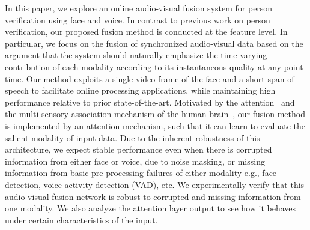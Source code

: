\documentclass{article}
\newcommand{\sscm}[1]{\textcolor{blue}{[#1 --SS]}}
\newcommand{\ohcm}[1]{\textcolor{red}{Oh$>$ #1 --}}
\begin{document}
In this paper, we explore an online audio-visual fusion system for person verification using face and voice.
In contrast to previous work on person verification, our proposed fusion method is conducted at the feature level.
In particular, we focus on the fusion of synchronized audio-visual data based on the argument that the system should naturally emphasize the time-varying contribution of each modality according to its instantaneous quality at any point time. 
Our method exploits a single video frame of the face and a short span of speech to facilitate online processing applications, while maintaining high performance relative to prior state-of-the-art.
Motivated by the attention~\cite{corbetta2002control} and the multi-sensory association mechanism of the human brain~\cite{von2006implicit}, our fusion method is implemented by an attention mechanism, such that it can learn to evaluate the salient modality of input data.
Due to the inherent robustness of this architecture, we expect stable performance even when there is corrupted information from either face or voice, due to noise masking, or missing information from basic pre-processing failures of either modality e.g., face detection, voice activity detection (VAD), etc.
We experimentally verify that this audio-visual fusion network is robust to corrupted and missing information from one modality.
We also analyze the attention layer output to see how it behaves under certain characteristics of the input.

\end{document}
